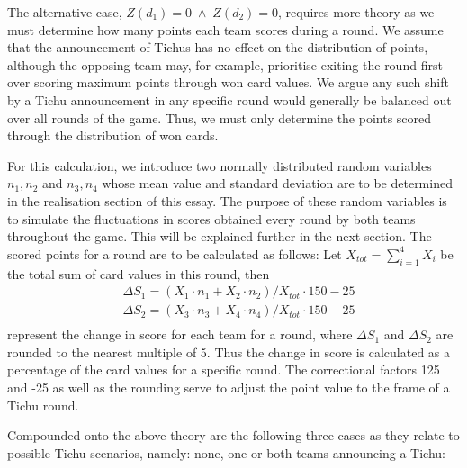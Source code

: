 The alternative case, $Z(d_1) = 0\; \land\; Z(d_2) = 0$, requires more theory as we must determine how many points each team scores during a round. We assume that the announcement of Tichus has no effect on the distribution of points, although the opposing team may, for example, prioritise exiting the round first over scoring maximum points through won card values. We argue any such shift by a Tichu announcement in any specific round would generally be balanced out over all rounds of the game. Thus, we must only determine the points scored through the distribution of won cards.

For this calculation, we introduce two normally distributed random variables $n_1,n_2$ and $n_3,n_4$ whose mean value and standard deviation are to be determined in the realisation section of this essay. The purpose of these random variables is to simulate the fluctuations in scores obtained every round by both teams throughout the game. This will be explained further in the next section. The scored points for a round are to be calculated as follows: Let $X_{tot} = \sum_{i=1}^{4} X_i$ be the total sum of card values in this round, then
\begin{align*}
    &\Delta S_1 = (X_1\cdot n_1 + X_2\cdot n_2)/ X_{tot} \cdot 150 - 25\\
    &\Delta S_2 = (X_3\cdot n_3 + X_4\cdot n_4)/ X_{tot} \cdot 150 - 25\\
\end{align*}
represent the change in score for each team for a round, where $\Delta S_1$ and $\Delta S_2$ are rounded to the nearest multiple of 5. Thus the change in score is calculated as a percentage of the card values for a specific round. The correctional factors 125 and -25 as well as the rounding serve to adjust the point value to the frame of a Tichu round.

Compounded onto the above theory are the following three cases as they relate to possible Tichu scenarios, namely: none, one or both teams announcing a Tichu:

